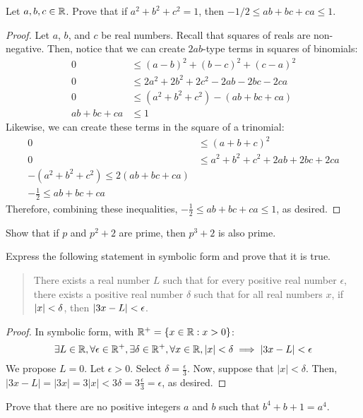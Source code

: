 \question Let $a,b,c\in\mathbb{R}$.
Prove that if $a^2 + b^2 + c^2 = 1$, then $-1/2 \leq ab+bc+ca \leq 1$.
\begin{proof}
  Let $a$, $b$, and $c$ be real numbers.
  Recall that squares of reals are non-negative.
  Then, notice that we can create $2ab$-type terms in squares of binomials:
  \begin{align*}
    0            & \leq (a-b)^2 + (b-c)^2 + (c-a)^2          \\
    0            & \leq 2a^2 + 2b^2 + 2c^2 - 2ab - 2bc - 2ca \\
    0            & \leq (a^2 + b^2 + c^2) - (ab + bc + ca)   \\
    ab + bc + ca & \leq 1
  \end{align*}
  Likewise, we can create these terms in the square of a trinomial:
  \begin{align*}
    0 & \leq (a+b+c)^2 \\
    0 & \leq a^2 + b^2 + c^2 + 2ab + 2bc + 2ca \\
    -(a^2 + b^2 + c^2) \leq 2(ab + bc + ca) \\
    -\frac{1}{2} \leq ab + bc + ca
  \end{align*}
  Therefore, combining these inequalities, $-\frac{1}{2} \leq ab + bc + ca \leq 1$, as desired.
\end{proof}

\question Show that if $p$ and $p^2+2$ are prime, then $p^3+2$ is also prime.

\question Express the following statement in symbolic form and prove that it is true.
\begin{quote}
  There exists a real number $L$ such that for every positive real number $\epsilon$,
  there exists a positive real number $\delta$ such that for all real numbers $x$,
  if $\abs{x} < \delta$, then $\abs{3x-L} < \epsilon$.
\end{quote}
\begin{proof}
  In symbolic form, with $\mathbb{R}^+ = \{ x \in \mathbb{R} : x > 0 \}$:
  \[ \exists L\in\mathbb{R}, \forall \epsilon\in\mathbb{R}^+, \exists \delta\in\mathbb{R}^+, \forall x\in\mathbb{R}, |x|<\delta \implies |3x-L| < \epsilon \]
  We propose $L = 0$.
  Let $\epsilon > 0$.
  Select $\delta = \frac{\epsilon}{3}$.
  Now, suppose that $|x| < \delta$.
  Then, $|3x - L| = |3x| = 3|x| < 3\delta = 3\frac{\epsilon}{3} = \epsilon$, as desired.
\end{proof}

\question Prove that there are no positive integers $a$ and $b$ such that $b^4+b+1 = a^4$.

